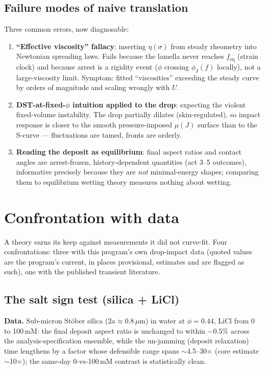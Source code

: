 \documentclass[11pt]{article}
\newcommand{\phiJ}{\phi_{\mathrm{J}}}
\begin{document}
\subsection{Failure modes of naive translation}
Three common errors, now diagnosable:
\begin{enumerate}
\item \textbf{``Effective viscosity'' fallacy}: inserting $\eta(\sigma)$ from steady rheometry into Newtonian spreading laws. Fails because the lamella never reaches $f_{\mathrm{eq}}$ (strain clock) and because arrest is a rigidity event ($\phi$ crossing $\phiJ(f)$ locally), not a large-viscosity limit. Symptom: fitted ``viscosities'' exceeding the steady curve by orders of magnitude and scaling wrongly with $U$.
\item \textbf{DST-at-fixed-$\phi$ intuition applied to the drop}: expecting the violent fixed-volume instability. The drop partially dilates (skin-regulated), so impact response is closer to the smooth pressure-imposed $\mu(J)$ surface than to the S-curve --- fluctuations are tamed, fronts are orderly.
\item \textbf{Reading the deposit as equilibrium}: final aspect ratios and contact angles are arrest-frozen, history-dependent quantities (act 3--5 outcomes), informative precisely because they are \emph{not} minimal-energy shapes; comparing them to equilibrium wetting theory measures nothing about wetting.
\end{enumerate}

\section{Confrontation with data}
\label{sec:confront}

A theory earns its keep against measurements it did not curve-fit. Four confrontations: three with this program's own drop-impact data (quoted values are the program's current, in places provisional, estimates and are flagged as such), one with the published transient literature.

\subsection{The salt sign test (silica + LiCl)}
\label{sec:salttest}
\textbf{Data.} Sub-micron St\"ober silica ($2a \approx 0.8\,\mu$m) in water at $\phi = 0.44$, LiCl from 0 to 100\,mM: the final deposit aspect ratio is unchanged to within $-0.5\%$ across the analysis-specification ensemble, while the un-jamming (deposit relaxation) time lengthens by a factor whose defensible range spans $\sim$4.5--30$\times$ (core estimate $\sim$10$\times$); the same-day 0-vs-100\,mM contrast is statistically clean.
\end{document}

